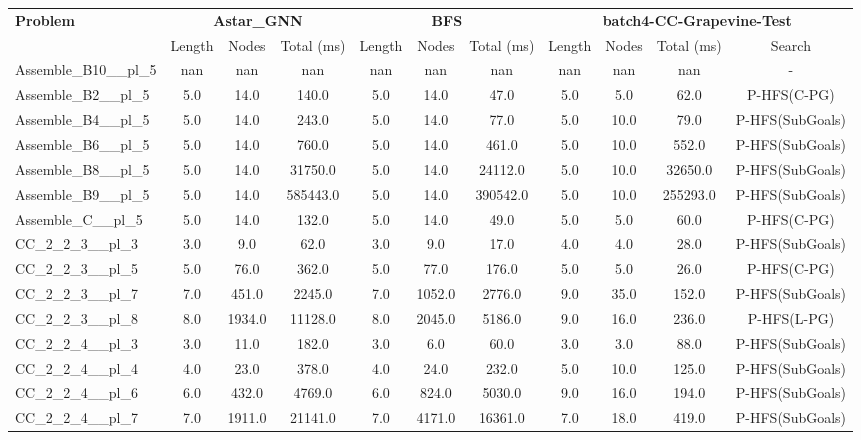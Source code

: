 \begin{table}[!ht]
\centering
\scriptsize
\begin{tabular}{l|ccc|ccc|cccc}
\multirow{2}{*}{\textbf{Problem}} & \multicolumn{3}{c|}{\textbf{Astar\_GNN}} & \multicolumn{3}{c|}{\textbf{BFS}} & \multicolumn{4}{c}{\textbf{batch4-CC-Grapevine-Test}} \\
\cline{2-11}
& Length & Nodes & Total (ms) & Length & Nodes & Total (ms) & Length & Nodes & Total (ms) & Search \\
\hline
Assemble\_B10\_\_pl\_5 & nan & nan & nan & nan & nan & nan & nan & nan & nan & - \\
Assemble\_B2\_\_pl\_5 & 5.0 & 14.0 & 140.0 & 5.0 & 14.0 & 47.0 & 5.0 & 5.0 & 62.0 & P-HFS(C-PG) \\
Assemble\_B4\_\_pl\_5 & 5.0 & 14.0 & 243.0 & 5.0 & 14.0 & 77.0 & 5.0 & 10.0 & 79.0 & P-HFS(SubGoals) \\
Assemble\_B6\_\_pl\_5 & 5.0 & 14.0 & 760.0 & 5.0 & 14.0 & 461.0 & 5.0 & 10.0 & 552.0 & P-HFS(SubGoals) \\
Assemble\_B8\_\_pl\_5 & 5.0 & 14.0 & 31750.0 & 5.0 & 14.0 & 24112.0 & 5.0 & 10.0 & 32650.0 & P-HFS(SubGoals) \\
Assemble\_B9\_\_pl\_5 & 5.0 & 14.0 & 585443.0 & 5.0 & 14.0 & 390542.0 & 5.0 & 10.0 & 255293.0 & P-HFS(SubGoals) \\
Assemble\_C\_\_pl\_5 & 5.0 & 14.0 & 132.0 & 5.0 & 14.0 & 49.0 & 5.0 & 5.0 & 60.0 & P-HFS(C-PG) \\
CC\_2\_2\_3\_\_pl\_3 & 3.0 & 9.0 & 62.0 & 3.0 & 9.0 & 17.0 & 4.0 & 4.0 & 28.0 & P-HFS(SubGoals) \\
CC\_2\_2\_3\_\_pl\_5 & 5.0 & 76.0 & 362.0 & 5.0 & 77.0 & 176.0 & 5.0 & 5.0 & 26.0 & P-HFS(C-PG) \\
CC\_2\_2\_3\_\_pl\_7 & 7.0 & 451.0 & 2245.0 & 7.0 & 1052.0 & 2776.0 & 9.0 & 35.0 & 152.0 & P-HFS(SubGoals) \\
CC\_2\_2\_3\_\_pl\_8 & 8.0 & 1934.0 & 11128.0 & 8.0 & 2045.0 & 5186.0 & 9.0 & 16.0 & 236.0 & P-HFS(L-PG) \\
CC\_2\_2\_4\_\_pl\_3 & 3.0 & 11.0 & 182.0 & 3.0 & 6.0 & 60.0 & 3.0 & 3.0 & 88.0 & P-HFS(SubGoals) \\
CC\_2\_2\_4\_\_pl\_4 & 4.0 & 23.0 & 378.0 & 4.0 & 24.0 & 232.0 & 5.0 & 10.0 & 125.0 & P-HFS(SubGoals) \\
CC\_2\_2\_4\_\_pl\_6 & 6.0 & 432.0 & 4769.0 & 6.0 & 824.0 & 5030.0 & 9.0 & 16.0 & 194.0 & P-HFS(SubGoals) \\
CC\_2\_2\_4\_\_pl\_7 & 7.0 & 1911.0 & 21141.0 & 7.0 & 4171.0 & 16361.0 & 7.0 & 18.0 & 419.0 & P-HFS(SubGoals) \\

\end{tabular}
\end{table}
